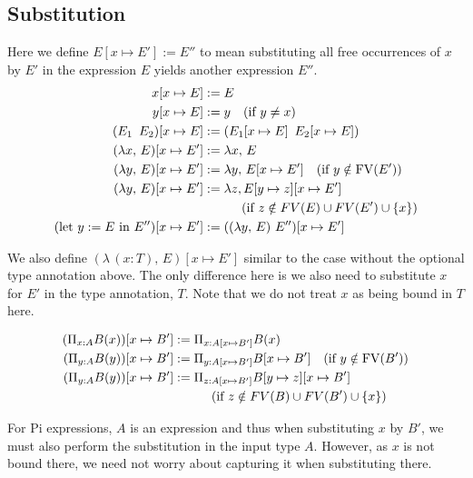 \documentclass{article}
\begin{document}
\subsection{Substitution}
Here we define $E [x \mapsto E'] := E''$ to mean substituting all free
occurrences of $x$ by $E'$ in the expression $E$ yields another expression $E''$.
\begin{align*}
  x[x \mapsto E] &:= E \\
  y[x \mapsto E] &:= y \quad (\text{if } y \ne x) \\
  (E_1 \,\,\, E_2) [x \mapsto E] &:= (E_1 [x \mapsto E] \,\,\, E_2 [x \mapsto E]) \\
  (\lambda x, \, E) [x \mapsto E'] &:= \lambda x, \, E \\ 
  (\lambda y, \, E) [x \mapsto E'] &:= \lambda y, \, E[x \mapsto E'] \quad (\text{if } y \notin \operatorname{FV}(E')) \\ 
  (\lambda y, \, E) [x \mapsto E'] &:= \lambda z, E[y \mapsto z][x \mapsto E'] \\
                 &\quad \quad \quad (\text{if } z \notin FV(E) \cup FV(E') \cup \{x\}) \\
  (\text{let } y := E \text{ in } E'') [x \mapsto E'] &:= 
    ((\lambda y, \, E) \,\, E'') [x \mapsto E']
\end{align*}

We also define $(\lambda \, (x : T), \, E) [x \mapsto E']$
similar to the case without the optional type annotation above. The only
difference here is we also need to substitute $x$ for $E'$ in the type annotation,
$T$. Note that we do not treat $x$ as being bound in $T$ here.

\begin{align*}
  (\Pi_{x : A} B(x)) [x \mapsto B'] &:= \Pi_{x : A[x \mapsto B']} B(x) \\ 
  (\Pi_{y : A} B(y)) [x \mapsto B'] &:= \Pi_{y : A[x \mapsto B']} B[x \mapsto B'] \quad (\text{if } y \notin \operatorname{FV}(B')) \\ 
  (\Pi_{y : A} B(y)) [x \mapsto B'] &:= \Pi_{z : A[x \mapsto B']} B[y \mapsto z][x \mapsto B'] \\
                 &\quad \quad \quad (\text{if } z \notin FV(B) \cup FV(B') \cup \{x\})
\end{align*}

For Pi expressions, $A$ is an expression and thus when substituting $x$ by
$B'$, we must also perform the substitution in the input type $A$. However, as
$x$ is not bound there, we need not worry about capturing it when substituting there. 
\end{document}
